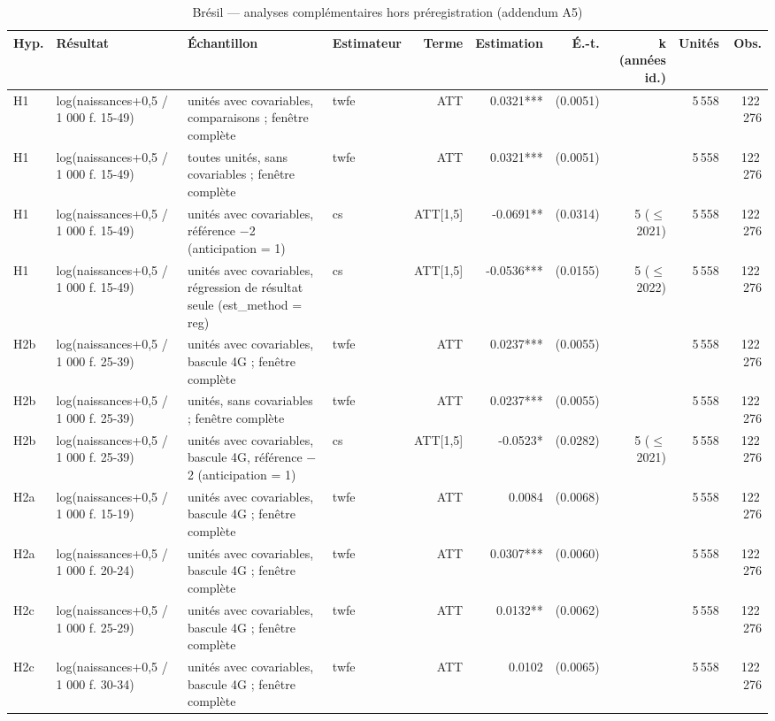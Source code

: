 \begin{table}\centering
\begin{threeparttable}
\caption{Brésil — analyses complémentaires hors préregistration (addendum A5)}\label{tab:br_exploratory}
\scriptsize
\begin{tabular}{lp{5.2cm}p{7.4cm}lrrrrrr}
\toprule
Hyp. & Résultat & Échantillon & Estimateur & Terme & Estimation & É.-t. & k (années id.) & Unités & Obs. \\
\midrule
H1 & log(naissances+0,5 / 1 000 f. 15-49) & unités avec covariables, comparaisons ; fenêtre complète & twfe & ATT & 0.0321*** & (0.0051) &  & 5\,558 & 122\,276 \\
H1 & log(naissances+0,5 / 1 000 f. 15-49) & toutes unités, sans covariables ; fenêtre complète & twfe & ATT & 0.0321*** & (0.0051) &  & 5\,558 & 122\,276 \\
H1 & log(naissances+0,5 / 1 000 f. 15-49) & unités avec covariables, référence $-$2 (anticipation = 1) & cs & ATT[1,5] & -0.0691** & (0.0314) & 5 ($\leq$ 2021) & 5\,558 & 122\,276 \\
H1 & log(naissances+0,5 / 1 000 f. 15-49) & unités avec covariables, régression de résultat seule (est\_method = reg) & cs & ATT[1,5] & -0.0536*** & (0.0155) & 5 ($\leq$ 2022) & 5\,558 & 122\,276 \\
H2b & log(naissances+0,5 / 1 000 f. 25-39) & unités avec covariables, bascule 4G ; fenêtre complète & twfe & ATT & 0.0237*** & (0.0055) &  & 5\,558 & 122\,276 \\
H2b & log(naissances+0,5 / 1 000 f. 25-39) & unités, sans covariables ; fenêtre complète & twfe & ATT & 0.0237*** & (0.0055) &  & 5\,558 & 122\,276 \\
H2b & log(naissances+0,5 / 1 000 f. 25-39) & unités avec covariables, bascule 4G, référence $-$2 (anticipation = 1) & cs & ATT[1,5] & -0.0523* & (0.0282) & 5 ($\leq$ 2021) & 5\,558 & 122\,276 \\
H2a & log(naissances+0,5 / 1 000 f. 15-19) & unités avec covariables, bascule 4G ; fenêtre complète & twfe & ATT & 0.0084 & (0.0068) &  & 5\,558 & 122\,276 \\
H2a & log(naissances+0,5 / 1 000 f. 20-24) & unités avec covariables, bascule 4G ; fenêtre complète & twfe & ATT & 0.0307*** & (0.0060) &  & 5\,558 & 122\,276 \\
H2c & log(naissances+0,5 / 1 000 f. 25-29) & unités avec covariables, bascule 4G ; fenêtre complète & twfe & ATT & 0.0132** & (0.0062) &  & 5\,558 & 122\,276 \\
H2c & log(naissances+0,5 / 1 000 f. 30-34) & unités avec covariables, bascule 4G ; fenêtre complète & twfe & ATT & 0.0102 & (0.0065) &  & 5\,558 & 122\,276 \\

\end{tabular}
\end{threeparttable}
\end{table}
